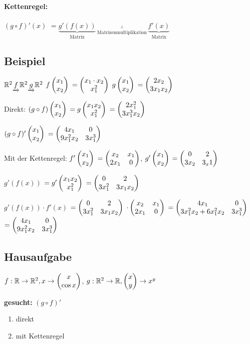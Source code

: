 \paragraph{Kettenregel:}
$(g\circ f)'(x)$
$=\underbrace{g'(f(x))}_{\textrm{Matrix}} \underbrace{\cdot}_{\textrm{Matrizenmultiplikation}} \underbrace{f'(x)}_{\textrm{Matrix}}$

\subsection{Beispiel}
$\mathbb{R}^2 \underrightarrow{f} \mathbb{R}^2 \underrightarrow{g} \mathbb{R}^2$
$f \begin{pmatrix} x_1\\x_2 \end{pmatrix} $
$= \begin{pmatrix} x_1 \cdot x_2\\ x_1^2 \end{pmatrix} $
$g \begin{pmatrix} x_1\\ x_2 \end{pmatrix} $
$= \begin{pmatrix} 2 x_2\\ 3 x_1 x_2 \end{pmatrix} $

Direkt:
$(g\circ f) \begin{pmatrix} x_1 \\ x_2 \end{pmatrix} $
$= g \begin{pmatrix} x_1 x_2 \\ x_1^2 \end{pmatrix} $
$=  \begin{pmatrix} 2 x_1^2\\ 3 x_1^3 x_2 \end{pmatrix} $

$(g\circ f)' \begin{pmatrix} x_1 \\ x_2 \end{pmatrix} $
$=  \begin{pmatrix} 4 x_1 & 0\\ 9 x_1^2 x_2 & 3 x_1^3 \end{pmatrix} $

Mit der Kettenregel: 
$f' \begin{pmatrix} x_1 \\ x_2 \end{pmatrix}  $
$= \begin{pmatrix} x_2 & x_1\\ 2 x_1 & 0 \end{pmatrix} $,
$g' \begin{pmatrix} x_1 \\ x_2 \end{pmatrix} $
$= \begin{pmatrix} 0 & 2\\3 x_2 & 3_x1 \end{pmatrix} $

$g'(f(x)) $
$= g'  \begin{pmatrix} x_1 x_2 \\ x_1^2 \end{pmatrix} $
$=  \begin{pmatrix} 0 & 2 \\ 3 x_1^2 & 3 x_1 x_2 \end{pmatrix} $

$g'(f(x)) \cdot f'(x) $
$= \begin{pmatrix} 0 & 2 \\ 3 x_1^2 & 3 x_1 x_2 \end{pmatrix} $
$\cdot  \begin{pmatrix} x_2 & x_1 \\ 2 x_1 & 0 \end{pmatrix} $
$=  \begin{pmatrix} 4 x_1 & 0 \\ 3 x_1^2 x_2 + 6 x_1^2 x_2 & 3 x_1^3 \end{pmatrix} $
$= \begin{pmatrix} 4 x_1 & 0 \\ 9 x_1^2 x_2 & 3 x_1^3 \end{pmatrix} $

\subsection{Hausaufgabe}
$ f: \mathbb{R} \rightarrow \mathbb{R}^2, x \rightarrow  \begin{pmatrix} x \\ \cos x \end{pmatrix} $, 
$ g: \mathbb{R}^2 \rightarrow \mathbb{R},  \begin{pmatrix} x\\y \end{pmatrix} \rightarrow x^y$

\textbf{gesucht:} $(g\circ f)'$
\begin{enumerate}
\item direkt
\item mit Kettenregel
\end{enumerate}
